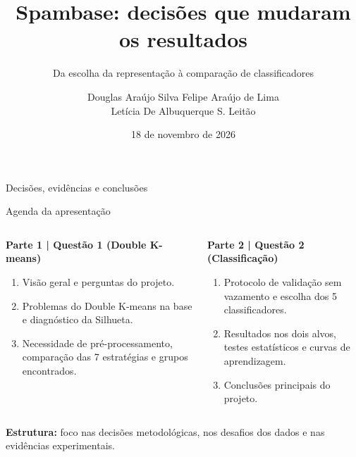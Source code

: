 \documentclass[aspectratio=169,11pt]{beamer}
\title[Spambase | Decisões]{\textbf{Spambase: decisões que mudaram os resultados}}
\subtitle{Da escolha da representação à comparação de classificadores}
\author[Douglas, Felipe e Leticia]{Douglas Ara\'ujo Silva \quad Felipe Ara\'ujo de Lima \\ Let\'icia De Albuquerque S. Leit\~ao}
\institute[CIn/UFPE]{Aprendizagem de M\'aquina -- IN1102 | P\'os-gradua\c c\~ao, CIn/UFPE}
\date{18 de novembro de 2026}
\begin{document}
\begin{frame}[plain]
\vspace{8mm}
\titlepage
\begin{center}
\end{center}
\vspace{1mm}
\centering\small\color{cinzaescuro}Decisões, evidências e conclusões
\end{frame}

\begin{frame}[t]{Agenda da apresentação}
\begin{columns}[T,onlytextwidth]
\begin{simplebox}
\small\textbf{\color{cinazul}Parte 1 | Questão 1 (Double K-means)}\par\vspace{1mm}
\footnotesize
\begin{enumerate}\setlength\itemsep{1.1mm}
\item Visão geral e perguntas do projeto.
\item Problemas do Double K-means na base e diagnóstico da Silhueta.
\item Necessidade de pré-processamento, comparação das 7 estratégias e grupos encontrados.
\end{enumerate}
\end{simplebox}
\begin{simplebox}
\small\textbf{\color{verdeescuro}Parte 2 | Questão 2 (Classificação)}\par\vspace{1mm}
\footnotesize
\begin{enumerate}\setlength\itemsep{1.1mm}
\setcounter{enumi}{3}
\item Protocolo de validação sem vazamento e escolha dos 5 classificadores.
\item Resultados nos dois alvos, testes estatísticos e curvas de aprendizagem.
\item Conclusões principais do projeto.
\end{enumerate}
\end{simplebox}
\end{columns}
\vspace{1mm}
\begin{notabox}
\footnotesize \textbf{Estrutura:} foco nas decisões metodológicas, nos desafios dos dados e nas evidências experimentais.
\end{notabox}
\end{frame}
\end{document}
